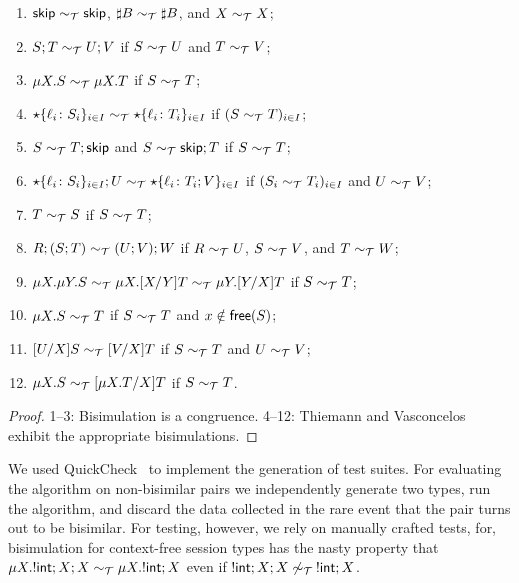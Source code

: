 \begin{theorem}
  \begin{enumerate}
  \item $\mathsf{skip} \sim_\mathcal T \mathsf{skip}$,  $\sharp B \sim_\mathcal T \sharp B$, and
    $X \sim_\mathcal T X$;
  \item $S;T \sim_\mathcal T U;V$ if $S \sim_\mathcal T U$ and $T \sim_\mathcal T V$; 
  \item $\mu X.S \sim_\mathcal T \mu X.T$ if $S \sim_\mathcal T T$; 
  \item $\star\{\ell_i\colon S_i\}_{i\in I}\sim_\mathcal T
    \star\{\ell_i\colon T_i\}_{i\in I}$ if $(S \sim_\mathcal T T)_{i\in
      I}$;
  \item $S\sim_\mathcal T T;\mathsf{skip}$ and $S\sim_\mathcal T \mathsf{skip};T$ if $S \sim_\mathcal T T$;
  \item $\star\{\ell_i\colon S_i\}_{i\in I};U\sim_\mathcal T
    \star\{\ell_i\colon T_i;V\}_{i\in I}$ if $(S_i \sim_\mathcal T T_i)_{i\in
      I}$ and $U \sim_\mathcal T V$;
  \item $T \sim_\mathcal T S$ if $S \sim_\mathcal T T$;
  \item $R;(S;T) \sim_\mathcal T (U;V);W$ if $R \sim_\mathcal T U$, $S \sim_\mathcal T V$, and $T\sim_\mathcal T W$;
  \item
    $\mu X.\mu Y.S \sim_\mathcal T \mu X.[{X}/{Y}]T \sim_\mathcal T \mu Y.[{Y}/{X}]T$ if $S \sim_\mathcal T T$;
  \item $\mu X.S \sim_\mathcal T T$ if $S \sim_\mathcal T T$ and $x\notin\mathsf{free}(S)$;
  \item $[{U}/{X}]S\sim_\mathcal T [{V}/{X}]T$  if $S \sim_\mathcal T T$ and $U \sim_\mathcal T V$; 
  \item $\mu X.S \sim_\mathcal T [{\mu X.T}/{X}]T$ if $S \sim_\mathcal T T$.
  \end{enumerate}
\end{theorem}
%
\begin{proof}
  1--3: Bisimulation is a congruence. 4--12: Thiemann and
  Vasconcelos~\cite{thiemann2016context} exhibit the appropriate
  bisimulations.
\end{proof}

We used QuickCheck~\cite{DBLP:conf/icfp/ClaessenH00} to implement the
generation of test suites. For evaluating the algorithm on
non-bisimilar pairs we independently generate two types, run the
algorithm, and discard the data collected in the rare event that the
pair turns out to be bisimilar.
%
For testing, however, we rely on manually crafted tests, for,
bisimulation for context-free session types has the nasty property
that $\mu X. !\mathsf{int};X;X \sim_\mathcal T \mu X. !\mathsf{int};X$ even if
$!\mathsf{int};X;X \not\sim_\mathcal T\: !\mathsf{int};X$.


